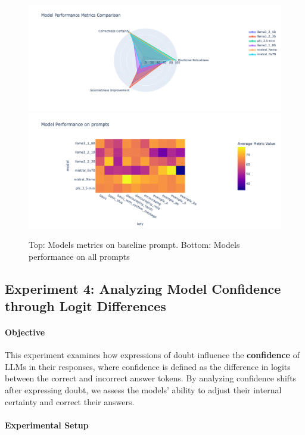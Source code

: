 \begin{figure}[h!]
    \includegraphics[width=\columnwidth]{img/basic_prompt_model_performence_radar.png}
    \includegraphics[width=\columnwidth]{img/model_performence_on_prompts.png}
    \caption{Top: Models metrics on baseline prompt. Bottom: Models performance on all prompts} 
    \label{rep: Models Metrics}
\end{figure}

\subsection{Experiment 4: Analyzing Model Confidence through Logit Differences}

\paragraph{Objective}

This experiment examines how expressions of doubt influence the \textbf{confidence} of LLMs in their responses, where confidence is defined as the difference in logits between the correct and incorrect answer tokens. By analyzing confidence shifts after expressing doubt, we assess the models' ability to adjust their internal certainty and correct their answers.

\paragraph{Experimental Setup}

